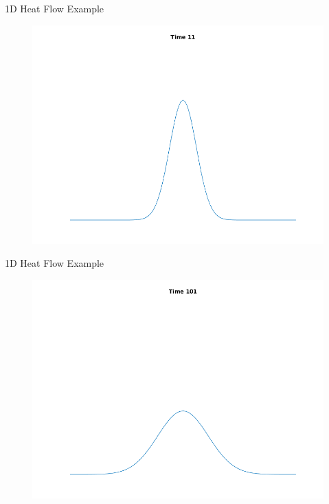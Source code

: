 \documentclass{beamer}
\begin{document}
\begin{frame}{1D Heat Flow Example}

\begin{figure}[t]
    \includegraphics[width=\textwidth]{2.png}
\end{figure}

\end{frame}

\begin{frame}{1D Heat Flow Example}

\begin{figure}[t]
    \includegraphics[width=\textwidth]{3.png}
\end{figure}

\end{frame}
\end{document}
